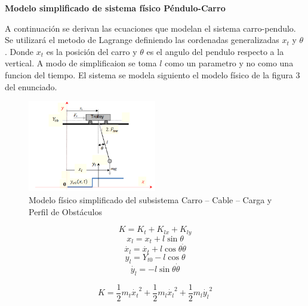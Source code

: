 \documentclass{article}
\begin{document}
        \textbf{Modelo simplificado de sistema físico Péndulo-Carro}

            A continuación se derivan las ecuaciones que modelan el sistema carro-pendulo. Se utilizará el metodo de Lagrange definiendo las cordenadas generalizadas 
            \(x_t\) y \(\theta\) . Donde \(x_t\) es la posición del carro y \(\theta\) es el angulo del pendulo respecto a la vertical. 
            A modo de simplificaion se toma \(l\) como un parametro y no como una funcion del tiempo.
            El sistema se modela siguiento el modelo físico de la figura 3 del enunciado.
            \begin{figure}[H]
                \centering
                \includegraphics[width=0.5\textwidth]{figs/figure3_enunciado.png}
                \caption{Modelo físico simplificado del subsistema Carro – Cable – Carga y Perfil de Obstáculos}
                \label{fig:pendulo}
            \end{figure}
            
            \begin{equation}\label{eq:kinetic1}
                K = K_t + K_{lx} + K_{ly}
            \end{equation}
            \begin{equation}\label{eq:xl}
                x_l=x_t+l\sin{\theta}
            \end{equation}
            \begin{equation}\label{eq:dxl}
                \dot{x_l}=\dot{x_t}+l\cos{\theta}\dot{\theta}
            \end{equation}
            \begin{equation}\label{eq:y}
                y_l=Y_{t0}-l\cos{\theta}
            \end{equation}
            \begin{equation}\label{eq:dy}
                \dot{y_l}=-l\sin{\theta}\dot{\theta}
            \end{equation}

            \begin{equation}\label{eq:kinetic2}
                K = \frac{1}{2}m_t\dot{x_t}^2   +\frac{1}{2}m_l\dot{x_l}^2  +\frac{1}{2}m_l\dot{y_l}^2
            \end{equation}
\end{document}
